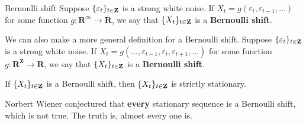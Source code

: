 \begin{Definition}{Bernoulli shift}{}
    Suppose $ \{\varepsilon_t\}_{t\in\mathbf{Z}} $ is a
    strong white noise. If $ X_t=g(\varepsilon_t,\varepsilon_{t-1},\ldots) $
    for some function $ g:\mathbf{R}^\infty \to \mathbf{R} $, we say that
    $ \{X_t\}_{t\in\mathbf{Z}} $ is a \textbf{Bernoulli shift}.
\end{Definition}
\begin{Remark}{}{}
    We can also make a more general definition for a Bernoulli shift.
    Suppose $ \{\varepsilon_t\}_{t\in\mathbf{Z}} $ is a
    strong white noise. If $ X_t=g(\ldots,\varepsilon_{t-1},\varepsilon_t,\varepsilon_{t+1},\ldots) $
    for some function $ g:\mathbf{R}^\mathbf{Z} \to \mathbf{R} $, we say that
    $ \{X_t\}_{t\in\mathbf{Z}} $ is a \textbf{Bernoulli shift}.
\end{Remark}
\begin{Theorem}{}{}
    If $ \{X_t\}_{t\in\mathbf{Z}} $ is a Bernoulli shift, then
    $ \{X_t\}_{t\in\mathbf{Z}} $ is strictly stationary.
\end{Theorem}
\begin{Remark}{}{}
    Norbert Wiener conjectured that \textbf{every} stationary
    sequence is a Bernoulli shift, which is not true. The truth is,
    almost every one is.
\end{Remark}
